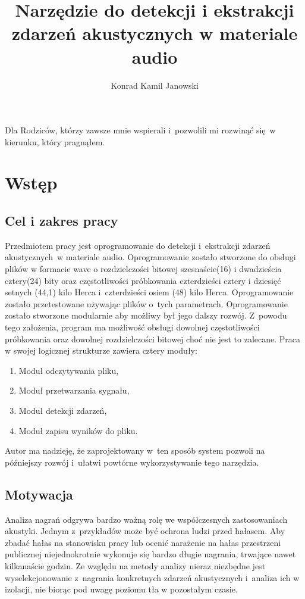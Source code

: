 \documentclass[eng,printmode]{mgr}
\title{Narzędzie do detekcji i ekstrakcji zdarzeń akustycznych w materiale audio}
\author{Konrad Kamil Janowski}
\begin{document}
 
\maketitle %
\dedication{6cm}{Dla Rodziców, którzy zawsze mnie wspierali i~pozwolili mi rozwinąć się~w kierunku, który pragnąłem.}

\tableofcontents %

\chapter{Wstęp}
\section{Cel i zakres pracy}
Przedmiotem pracy jest oprogramowanie do detekcji i~ekstrakcji zdarzeń akustycznych~w materiale audio. Oprogramowanie zostało stworzone do obsługi plików w formacie wave o rozdzielczości bitowej szesnaście(16) i dwadzieścia cztery(24) bity oraz częstotliwości próbkowania czterdzieści cztery i dziesięć setnych (44,1) kilo Herca i~czterdzieści osiem (48) kilo Herca. Oprogramowanie zostało przetestowane używając plików o~tych parametrach. Oprogramowanie zostało stworzone modularnie aby możliwy był jego dalszy rozwój. Z~powodu tego założenia, program ma możliwość obsługi dowolnej częstotliwości próbkowania oraz dowolnej rozdzielczości bitowej choć nie jest to zalecane. Praca w swojej logicznej strukturze zawiera cztery moduły:
\begin{enumerate}
\item Moduł odczytywania pliku,
\item Moduł przetwarzania sygnału,
\item Moduł detekcji zdarzeń,
\item Moduł zapisu wyników do pliku.
\end{enumerate}
Autor ma nadzieję, że zaprojektowany w~ten sposób system pozwoli na późniejszy rozwój i~ułatwi powtórne wykorzystywanie tego narzędzia.
\section{Motywacja}
Analiza nagrań odgrywa bardzo ważną rolę we współczesnych zastosowaniach akustyki. Jednym z~przykładów może być ochrona ludzi przed hałasem. Aby zbadać hałas na stanowisku pracy lub ocenić narażenie na hałas przestrzeni publicznej niejednokrotnie wykonuje się bardzo długie nagrania, trwające nawet kilkanaście godzin. Ze względu na metody analizy nieraz niezbędne jest wyselekcjonowanie z~nagrania konkretnych zdarzeń akustycznych i~analiza ich w izolacji, nie biorąc pod uwagę poziomu tła w pozostałym czasie. 
\end{document}

